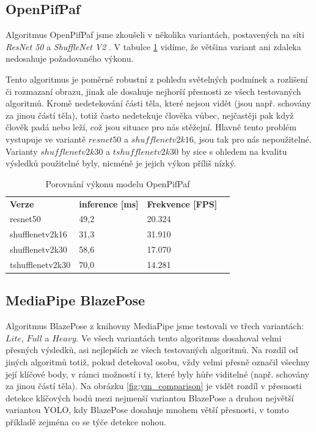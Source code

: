 \subsection{OpenPifPaf}

Algoritmus OpenPifPaf jsme zkoušeli v několika variantách, postavených na síti
\textit{ResNet 50} a \textit{ShuffleNet V2} \cite{shufflenetv2}. V tabulce
\ref{tab:openpifpaf_performance} vidíme, že většina variant ani zdaleka
nedosahuje požadovaného výkonu.

Tento algoritmus je poměrně robustní z pohledu světelných podmínek a rozlišení
či rozmazaní obrazu, jinak ale dosahuje nejhorší přesnosti ze všech testovaných
algoritmů. Kromě nedetekování části těla, které nejsou vidět (jsou např.
schovány za jinou částí těla), totiž často nedetekuje člověka vůbec, nejčastěji
pak když člověk padá nebo leží, což jsou situace pro nás stěžejní. Hlavně tento
problém vystupuje ve variantě $resnet50$ a $shufflenetv2k16$, jsou tak pro nás
nepoužitelné. Varianty $shufflenetv2k30$ a $tshufflenetv2k30$ by sice s ohledem
na kvalitu výsledků použitelné byly, nicméně je jejich výkon příliš nízký.

\begin{table}[htbp]
    \centering
    \caption{Porovnání výkonu modelu OpenPifPaf}
    \label{tab:openpifpaf_performance}
    \begin{tabular}{|l|l|l|l|}
        \hline
        \textbf{Verze}   & \textbf{inference [ms]} & \textbf{Frekvence [FPS]} \\
        resnet50         & 49,2                    & 20.324                   \\ \hline
        shufflenetv2k16  & 31,3                    & 31.910                   \\ \hline
        shufflenetv2k30  & 58,6                    & 17.070                   \\ \hline
        tshufflenetv2k30 & 70,0                    & 14.281                   \\ \hline
    \end{tabular}
\end{table}

\subsection{MediaPipe BlazePose}

Algoritmus BlazePose z knihovny MediaPipe jsme testovali ve třech variantách:
$Lite$, $Full$ a $Heavy$. Ve všech variantách tento algoritmus dosahoval velmi
přesných výsledků, asi nejlepších ze všech testovaných algoritmů. Na rozdíl od
jiných algoritmů totiž, pokud detekoval osobu, vždy velmi přesně označil
všechny její klíčové body, v rámci možností i ty, které byly hůře viditelné
(např. schovány za jinou částí těla). Na obrázku \ref{fig:ym_comparison} je
vidět rozdíl v přesnosti detekce klíčových bodů mezi nejmenší variantou
BlazePose a druhou největší variantou YOLO, kdy BlazePose dosahuje mnohem větší
přesnosti, v tomto příkladě zejména co se týče detekce nohou.

